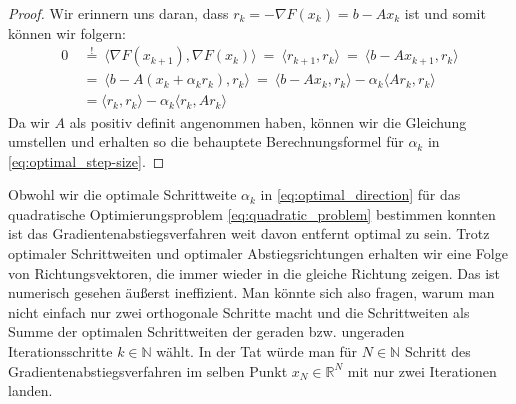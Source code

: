 \begin{proof}
Wir erinnern uns daran, dass $r_k = -\nabla F(x_k) = b - Ax_{k}$ ist und somit können wir folgern:
\begin{equation*}
\begin{split}
0 \ &\overset{!}{=} \ \langle \nabla F(x_{k+1}), \nabla F(x_k) \rangle \ = \ \langle r_{k+1}, r_k \rangle \ = \ \langle b - Ax_{k+1}, r_k \rangle \\
 \ &= \ \langle b - A(x_k + \alpha_kr_k), r_k \rangle \ = \  \langle b - Ax_k, r_k \rangle - \alpha_k \langle Ar_k, r_k \rangle \\
 \ &= \langle r_k, r_k \rangle - \alpha_k \langle r_k, Ar_k \rangle
\end{split}
\end{equation*}
Da wir $A$ als positiv definit angenommen haben, können wir die Gleichung umstellen und erhalten so die behauptete Berechnungsformel für $\alpha_k$ in \eqref{eq:optimal_step-size}.
\end{proof}

Obwohl wir die optimale Schrittweite $\alpha_k$ in \eqref{eq:optimal_direction} für das quadratische Optimierungsproblem \eqref{eq:quadratic_problem} bestimmen konnten ist das Gradientenabstiegsverfahren weit davon entfernt optimal zu sein.
Trotz optimaler Schrittweiten und optimaler Abstiegsrichtungen erhalten wir eine Folge von Richtungsvektoren, die immer wieder in die gleiche Richtung zeigen.
Das ist numerisch gesehen äußerst ineffizient.
Man könnte sich also fragen, warum man nicht einfach nur zwei orthogonale Schritte macht und die Schrittweiten als Summe der optimalen Schrittweiten der geraden bzw. ungeraden Iterationsschritte $k \in \mathbb{N}$ wählt.
In der Tat würde man für $N \in \mathbb{N}$ Schritt des Gradientenabstiegsverfahren im selben Punkt $x_N \in \mathbb{R}^N$ mit nur zwei Iterationen landen.

